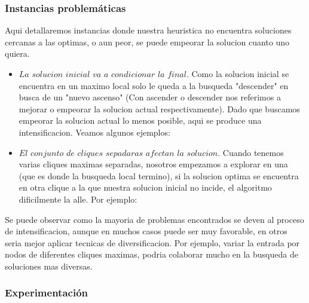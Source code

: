 \subsubsection{Instancias problemáticas}

 Aqui detallaremos instancias donde nuestra heuristica no encuentra soluciones cercanas a las optimas, o aun peor, se puede empeorar la solucion cuanto uno quiera.

\begin{itemize}
 
  \item $La$ $solucion$ $inicial$ $va$ $a$ $condicionar$ $la$ $final$. Como la solucion inicial se encuentra en un maximo local solo le queda a la busqueda "descender" en busca de un "nuevo ascenso" (Con ascender o descender nos referimos a mejorar o empeorar la solucion actual respectivamente). Dado que buscamos empeorar la solucion actual lo menos posible, aqui se produce una intensificacion. Veamos algunos ejemplos:

  \item $El$ $conjunto$ $de$ $cliques$ $sepadaras$ $afectan$ $la$ $solucion$. Cuando tenemos varias cliques maximas separadas, nosotros empezamos a explorar en una (que es donde la busqueda local termino), si la solucion optima se encuentra en otra clique a la que nuestra solucion inicial no incide, el algoritmo dificilmente la alle. Por ejemplo:

\end{itemize}

Se puede observar como la mayoria de problemas encontrados se deven al proceso de intensificacion, aunque en muchos casos puede ser muy favorable, en otros seria mejor aplicar tecnicas de diversificacion. Por ejemplo, variar la entrada por nodos de diferentes cliques maximas, podria colaborar mucho en la busqueda de soluciones mas diversas.

\subsubsection{Experimentación}
